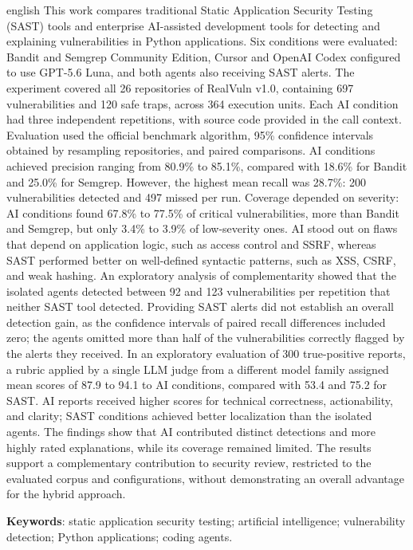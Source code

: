 \begin{resumo}[Abstract]
 \begin{otherlanguage*}{english}
This work compares traditional Static Application Security Testing (SAST) tools and enterprise AI-assisted development tools for detecting and explaining vulnerabilities in Python applications. Six conditions were evaluated: Bandit and Semgrep Community Edition, Cursor and OpenAI Codex configured to use GPT-5.6 Luna, and both agents also receiving SAST alerts. The experiment covered all 26 repositories of RealVuln v1.0, containing 697 vulnerabilities and 120 safe traps, across 364 execution units. Each AI condition had three independent repetitions, with source code provided in the call context. Evaluation used the official benchmark algorithm, 95\% confidence intervals obtained by resampling repositories, and paired comparisons. AI conditions achieved precision ranging from 80.9\% to 85.1\%, compared with 18.6\% for Bandit and 25.0\% for Semgrep. However, the highest mean recall was 28.7\%: 200 vulnerabilities detected and 497 missed per run. Coverage depended on severity: AI conditions found 67.8\% to 77.5\% of critical vulnerabilities, more than Bandit and Semgrep, but only 3.4\% to 3.9\% of low-severity ones. AI stood out on flaws that depend on application logic, such as access control and SSRF, whereas SAST performed better on well-defined syntactic patterns, such as XSS, CSRF, and weak hashing. An exploratory analysis of complementarity showed that the isolated agents detected between 92 and 123 vulnerabilities per repetition that neither SAST tool detected. Providing SAST alerts did not establish an overall detection gain, as the confidence intervals of paired recall differences included zero; the agents omitted more than half of the vulnerabilities correctly flagged by the alerts they received. In an exploratory evaluation of 300 true-positive reports, a rubric applied by a single LLM judge from a different model family assigned mean scores of 87.9 to 94.1 to AI conditions, compared with 53.4 and 75.2 for SAST. AI reports received higher scores for technical correctness, actionability, and clarity; SAST conditions achieved better localization than the isolated agents. The findings show that AI contributed distinct detections and more highly rated explanations, while its coverage remained limited. The results support a complementary contribution to security review, restricted to the evaluated corpus and configurations, without demonstrating an overall advantage for the hybrid approach.
   \vspace{\onelineskip}
 
   \noindent 
   \textbf{Keywords}: static application security testing; artificial intelligence; vulnerability detection; Python applications; coding agents.
 \end{otherlanguage*}
\end{resumo}
